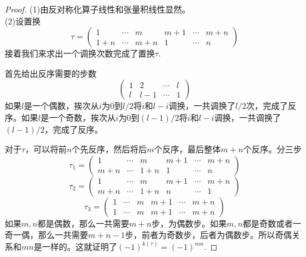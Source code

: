 \documentclass[11pt,a4paper,openany]{book}%
\theoremstyle{plain}%
\begin{document}
\begin{proof}

(1)由反对称化算子线性和张量积线性显然。\\
(2)设置换
\[
\tau=
\begin{pmatrix}
1& \cdots & m & m+1 &\cdots &m+n\\
1+n& \cdots & m+n & 1 &\cdots &n
\end{pmatrix}
\]
接着我们来求出一个调换次数完成了置换$\tau$.

首先给出反序需要的步数
\[
\begin{pmatrix}
1&2& \cdots &l\\
l&l-1& \cdots & 1
\end{pmatrix}
\]
\indent 如果$l$是一个偶数，挨次从$i$为$0$到$l/2$将$i$和$l-i$调换，一共调换了$l/2$次，完成了反序。如果$l$是一个奇数，挨次从$i$为$0$到$(l-1)/2$将$i$和$l-i$调换，一共调换了$(l-1)/2$，完成了反序。

对于$\tau$，可以将前$n$个先反序，然后将后$m$个反序，最后整体$m+n$个反序。分三步
\[
\tau_1=
\begin{pmatrix}
1& \cdots & m & m+1 &\cdots &m+n\\
m+n& \cdots & 1+n & 1 &\cdots &n
\end{pmatrix}
\]
\[
\tau_2=
\begin{pmatrix}
1& \cdots & m & m+1 &\cdots &m+n\\
m+n& \cdots & 1+n & n &\cdots &1
\end{pmatrix}
\]
\[
\tau_3=
\begin{pmatrix}
1& \cdots & m & m+1 &\cdots &m+n\\
1& \cdots & m & m+1 &\cdots &m+n
\end{pmatrix}
\]
如果$m,n$都是偶数，那么一共需要$m+n$步，为偶数步。如果$m,n$都是奇数或者一奇一偶，那么一共需要$m+n-1$步，前者为奇数步，后者为偶数步。所以奇偶关系和$mn$是一样的。这就证明了$(-1)^{k(\tau)}=(-1)^{mn}$.


\end{proof}
\end{document}
